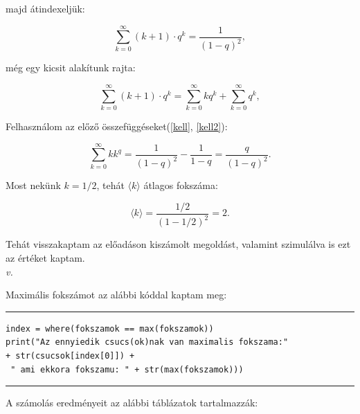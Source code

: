 \documentclass[a4paper, 12pt]{article}
\numberwithin{equation}{section}          %
\numberwithin{figure}{subsection}
\begin{document}
majd átindexeljük:

\begin{center}
	\begin{equation}
	\sum_{k = 0}^{\infty} (k+1) \cdot q^{k} =  \frac{1}{(1 - q)^2}, 
	\end{equation}
	\label{kell2}
\end{center}

még egy kicsit alakítunk rajta:
\begin{center}
	\begin{equation}
	\sum_{k = 0}^{\infty} (k+1) \cdot q^{k} =  \sum_{k = 0}^{\infty} kq^k + \sum_{k = 0}^{\infty}q^k, 
	\end{equation}
	\label{kell3}
\end{center}


Felhasználom az előző összefüggéseket(\ref{kell}, \ref{kell2}):

\begin{center}
	\begin{equation}
	\sum_{k = 0}^{\infty} kk^q  =  \frac{1}{(1 - q)^2} - \frac{1}{1 - q} = \frac{q}{(1 - q)^2}. 
	\end{equation}
	\label{}
\end{center}

Most nekünk $k = 1/2$, tehát $\langle k \rangle$ átlagos fokszáma:

\begin{center}
	\begin{equation}
	\langle k \rangle = \frac{1/2}{(1-1/2)^2} = 2.
	\end{equation}
	\label{}
\end{center}

Tehát visszakaptam az előadáson kiszámolt megoldást, valamint szimulálva is ezt az értéket kaptam.\\
\clearpage
\textit{v.}\newline

Maximális fokszámot az alábbi kóddal kaptam meg:
\newline
\rule{\textwidth}{0.1pt}
\begin{lstlisting}
index = where(fokszamok == max(fokszamok))
print("Az ennyiedik csucs(ok)nak van maximalis fokszama:"
+ str(csucsok[index[0]]) +
 " ami ekkora fokszamu: " + str(max(fokszamok)))
\end{lstlisting}
\rule{\textwidth}{0.1pt}

A számolás eredményeit az alábbi táblázatok tartalmazzák:
\end{document}
